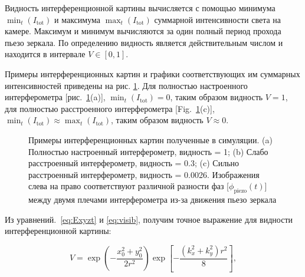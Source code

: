 Видность интерференционной картины вычисляется с помощью минимума $\min_t(I_{\mathrm{tot}})$ и максимума $\max_t(I_{\mathrm{tot}})$ суммарной интенсивности света на камере. Максимум и минимум вычисляются за один полный период прохода пьезо зеркала. По определению видность является действительным числом и находится в интервале $V \in [0, 1]$. 

Примеры интерференционных картин и графики соответствующих им суммарных интенсивностей приведены на рис. \ref{fig:visib_expl}. Для полностью настроенного интерферометра [рис.~\ref{fig:visib_expl}(a)], $\min_t(I_{\mathrm{tot}})=0$, таким образом видность $V=1$, для полностью расстроенного интерферометра [Fig.~\ref{fig:visib_expl}(c)], $\min_t(I_{\mathrm{tot}})\approx\max_t(I_{\mathrm{tot}})$, таким образом видность $V\approx 0$.

\begin{figure}[ht]
\caption{Примеры интерференционных картин полученные в симуляции. (a) Полностью настроенный интерферометр, видность = 1; (b) Слабо расстроенный интерферометр, видность = 0.3; (c) Сильно расстроенный интерферометр, видность =
0.0026. Изображения слева на право соответствуют различной разности фаз [$\phi_{\mathrm{piezo}}(t)$] между двумя плечами интерферометра из-за движения пьезо зеркала}
\label{fig:visib_expl}
\end{figure}


Из уравнений.~\eqref{eq:Exyzt} и \eqref{eq:visib}, получим точное выражение для видности интерференционной картины:

\begin{equation}
    V = \exp\left(- \frac{x_0^2 + y_0^2}{2 r^2}\right)  \exp\left[- \frac{(k_x^2 + k_y^2) r^2}{8}\right],
    \label{eq:visib_rot}
\end{equation}

